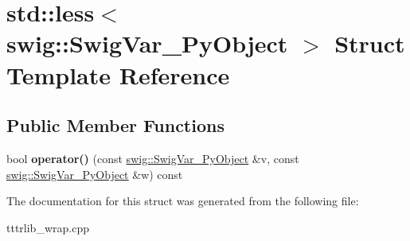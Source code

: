 \hypertarget{structstd_1_1less_3_01swig_1_1_swig_var___py_object_01_4}{}\section{std\+:\+:less$<$ swig\+:\+:Swig\+Var\+\_\+\+Py\+Object $>$ Struct Template Reference}
\label{structstd_1_1less_3_01swig_1_1_swig_var___py_object_01_4}
\subsection*{Public Member Functions}
\begin{DoxyCompactItemize}
\item 
\mbox{\label{structstd_1_1less_3_01swig_1_1_swig_var___py_object_01_4_af01d1f1add92ca309f9bf39e55ee18f8}} 
bool {\bfseries operator()} (const \hyperlink{structswig_1_1_swig_var___py_object}{swig\+::\+Swig\+Var\+\_\+\+Py\+Object} \&v, const \hyperlink{structswig_1_1_swig_var___py_object}{swig\+::\+Swig\+Var\+\_\+\+Py\+Object} \&w) const
\end{DoxyCompactItemize}


The documentation for this struct was generated from the following file\+:\begin{DoxyCompactItemize}
\item 
tttrlib\+\_\+wrap.\+cpp\end{DoxyCompactItemize}
